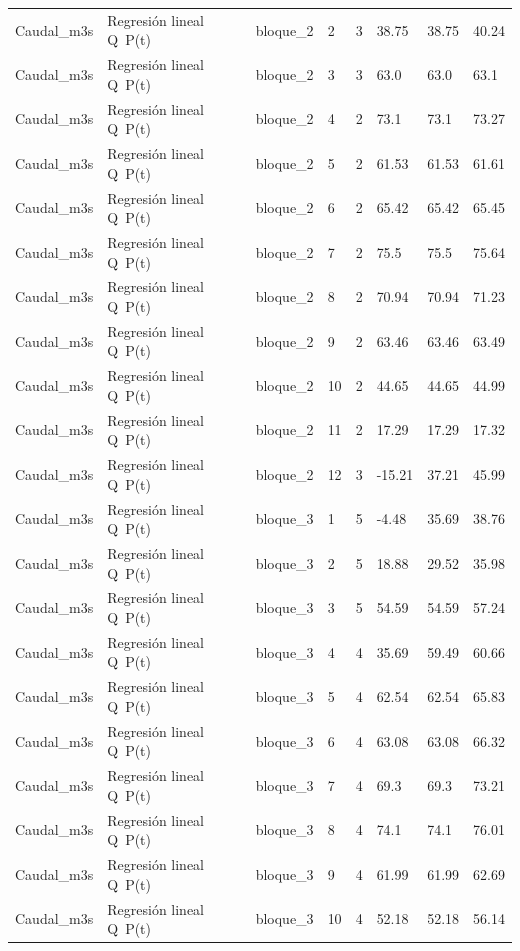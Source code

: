 \begin{longtable}{llllllll}
Caudal\_m3s & Regresión lineal Q~P(t) & bloque\_2 & 2 & 3 & 38.75 & 38.75 & 40.24 \\
Caudal\_m3s & Regresión lineal Q~P(t) & bloque\_2 & 3 & 3 & 63.0 & 63.0 & 63.1 \\
Caudal\_m3s & Regresión lineal Q~P(t) & bloque\_2 & 4 & 2 & 73.1 & 73.1 & 73.27 \\
Caudal\_m3s & Regresión lineal Q~P(t) & bloque\_2 & 5 & 2 & 61.53 & 61.53 & 61.61 \\
Caudal\_m3s & Regresión lineal Q~P(t) & bloque\_2 & 6 & 2 & 65.42 & 65.42 & 65.45 \\
Caudal\_m3s & Regresión lineal Q~P(t) & bloque\_2 & 7 & 2 & 75.5 & 75.5 & 75.64 \\
Caudal\_m3s & Regresión lineal Q~P(t) & bloque\_2 & 8 & 2 & 70.94 & 70.94 & 71.23 \\
Caudal\_m3s & Regresión lineal Q~P(t) & bloque\_2 & 9 & 2 & 63.46 & 63.46 & 63.49 \\
Caudal\_m3s & Regresión lineal Q~P(t) & bloque\_2 & 10 & 2 & 44.65 & 44.65 & 44.99 \\
Caudal\_m3s & Regresión lineal Q~P(t) & bloque\_2 & 11 & 2 & 17.29 & 17.29 & 17.32 \\
Caudal\_m3s & Regresión lineal Q~P(t) & bloque\_2 & 12 & 3 & -15.21 & 37.21 & 45.99 \\
Caudal\_m3s & Regresión lineal Q~P(t) & bloque\_3 & 1 & 5 & -4.48 & 35.69 & 38.76 \\
Caudal\_m3s & Regresión lineal Q~P(t) & bloque\_3 & 2 & 5 & 18.88 & 29.52 & 35.98 \\
Caudal\_m3s & Regresión lineal Q~P(t) & bloque\_3 & 3 & 5 & 54.59 & 54.59 & 57.24 \\
Caudal\_m3s & Regresión lineal Q~P(t) & bloque\_3 & 4 & 4 & 35.69 & 59.49 & 60.66 \\
Caudal\_m3s & Regresión lineal Q~P(t) & bloque\_3 & 5 & 4 & 62.54 & 62.54 & 65.83 \\
Caudal\_m3s & Regresión lineal Q~P(t) & bloque\_3 & 6 & 4 & 63.08 & 63.08 & 66.32 \\
Caudal\_m3s & Regresión lineal Q~P(t) & bloque\_3 & 7 & 4 & 69.3 & 69.3 & 73.21 \\
Caudal\_m3s & Regresión lineal Q~P(t) & bloque\_3 & 8 & 4 & 74.1 & 74.1 & 76.01 \\
Caudal\_m3s & Regresión lineal Q~P(t) & bloque\_3 & 9 & 4 & 61.99 & 61.99 & 62.69 \\
Caudal\_m3s & Regresión lineal Q~P(t) & bloque\_3 & 10 & 4 & 52.18 & 52.18 & 56.14 \\

\end{longtable}
